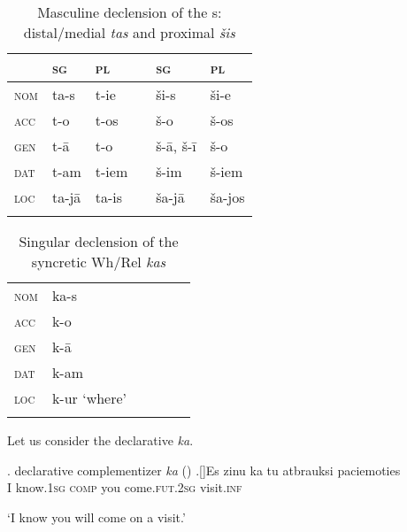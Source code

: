 \begin{table}
\caption{Masculine declension of the  s: distal/medial \textit{tas} and proximal \textit{\v{s}is}}
\label{Lat:cases} 
\begin{tabular}[th]{ l l l l l l }
\lsptoprule	
 			&  \textsc{sg}	& \textsc{pl} & & \textsc{sg} & \textsc{pl}\\\midrule	
\textsc{nom} 	&	ta-s					& t-ie 	& & \v{s}i-s	& \v{s}i-e\\
\textsc{acc} 	& 	t-o					& t-os 	& & \v{s}-o 	& \v{s}-os\\
\textsc{gen} 	&	t-\={a}	& t-o 	& & \v{s}-\={a}, \v{s}-\={i} & \v{s}-o\\
\textsc{dat} 	&	t-am					& t-iem 	& & \v{s}-im	& \v{s}-iem\\
\textsc{loc} 	&	ta-j\={a} & ta-is 	& & \v{s}a-j\={a} & \v{s}a-jos\\
\lspbottomrule	
\end{tabular}
\end{table}

\begin{table}
\caption{Singular declension of the  syncretic Wh/Rel \textit{kas}}
\label{kas:cases} 
\begin{tabular}[t]{ l l l l l l }
\lsptoprule	
\textsc{nom} 	&	ka-s\\
\textsc{acc} 	& 	k-o\\
\textsc{gen} 	&	k-\={a}\\
\textsc{dat} 	&	k-am\\\midrule
\textsc{loc}	&	k-ur `where'\\
\lspbottomrule
\end{tabular}
\end{table}
 
\par Let us consider the  declarative  \textit{ka}.


\ex.  declarative complementizer \textit{ka}\label{ex:ka} (\citealt[229]{Holvoet2016})
\ag.[]\hspace{-22pt}Es zinu  ka tu atbrauksi paciemoties \\
\hspace{-22pt}I know.\textsc{1sg}   \textsc{comp} you come.\textsc{fut.2sg} visit.\textsc{inf}\\
\hspace{-22pt}\strut `I know you will come on a visit.'

